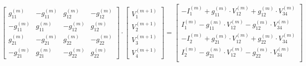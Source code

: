 \begin{equation}
\begin{bmatrix}
 g_{11}^{(m)} & -g_{11}^{(m)} &  g_{12}^{(m)} & -g_{12}^{(m)}\\
-g_{11}^{(m)} &  g_{11}^{(m)} & -g_{12}^{(m)} &  g_{12}^{(m)}\\
 g_{21}^{(m)} & -g_{21}^{(m)} &  g_{22}^{(m)} & -g_{22}^{(m)}\\
-g_{21}^{(m)} &  g_{21}^{(m)} & -g_{22}^{(m)} &  g_{22}^{(m)}
\end{bmatrix}
\cdot
\begin{bmatrix}
V_{1}^{(m+1)}\\
V_{2}^{(m+1)}\\
V_{3}^{(m+1)}\\
V_{4}^{(m+1)}
\end{bmatrix}
=
\begin{bmatrix}
-I_1^{(m)} + g_{11}^{(m)}\cdot V_{12}^{(m)} + g_{12}^{(m)}\cdot V_{34}^{(m)}\\
 I_1^{(m)} - g_{11}^{(m)}\cdot V_{12}^{(m)} - g_{12}^{(m)}\cdot V_{34}^{(m)}\\
-I_2^{(m)} + g_{21}^{(m)}\cdot V_{12}^{(m)} + g_{22}^{(m)}\cdot V_{34}^{(m)}\\
 I_2^{(m)} - g_{21}^{(m)}\cdot V_{12}^{(m)} - g_{22}^{(m)}\cdot V_{34}^{(m)}\\
\end{bmatrix}
\end{equation}


